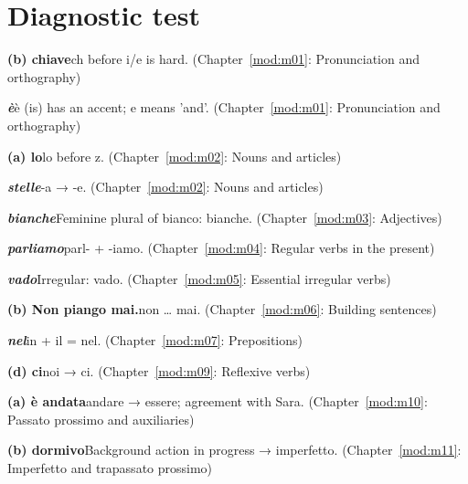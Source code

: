 \documentclass[11pt,a4paper,twoside,openright]{book}
\begin{document}
\section*{Diagnostic test}\label{ans:diag}
\begin{answers}
\item\relax \textbf{(b) chiave}\newline ch before i/e is hard. {\color{muted}(Chapter~\ref{mod:m01}: Pronunciation and orthography)}
\item\relax \textbf{\textit{è}}\newline è (is) has an accent; e means 'and'. {\color{muted}(Chapter~\ref{mod:m01}: Pronunciation and orthography)}
\item\relax \textbf{(a) lo}\newline lo before z. {\color{muted}(Chapter~\ref{mod:m02}: Nouns and articles)}
\item\relax \textbf{\textit{stelle}}\newline -a → -e. {\color{muted}(Chapter~\ref{mod:m02}: Nouns and articles)}
\item\relax \textbf{\textit{bianche}}\newline Feminine plural of bianco: bianche. {\color{muted}(Chapter~\ref{mod:m03}: Adjectives)}
\item\relax \textbf{\textit{parliamo}}\newline parl- + -iamo. {\color{muted}(Chapter~\ref{mod:m04}: Regular verbs in the present)}
\item\relax \textbf{\textit{vado}}\newline Irregular: vado. {\color{muted}(Chapter~\ref{mod:m05}: Essential irregular verbs)}
\item\relax \textbf{(b) Non piango mai.}\newline non … mai. {\color{muted}(Chapter~\ref{mod:m06}: Building sentences)}
\item\relax \textbf{\textit{nel}}\newline in + il = nel. {\color{muted}(Chapter~\ref{mod:m07}: Prepositions)}
\item\relax \textbf{(d) ci}\newline noi → ci. {\color{muted}(Chapter~\ref{mod:m09}: Reflexive verbs)}
\item\relax \textbf{(a) è andata}\newline andare → essere; agreement with Sara. {\color{muted}(Chapter~\ref{mod:m10}: Passato prossimo and auxiliaries)}
\item\relax \textbf{(b) dormivo}\newline Background action in progress → imperfetto. {\color{muted}(Chapter~\ref{mod:m11}: Imperfetto and trapassato prossimo)}

\end{answers}
\end{document}
